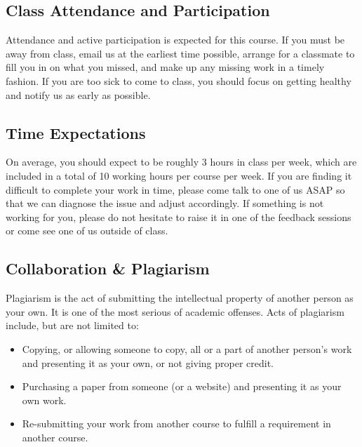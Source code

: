 \documentclass[
]{article}
\begin{document}
\hypertarget{class-attendance-and-participation}{%
\subsection*{Class Attendance and Participation}\label{class-attendance-and-participation}}

Attendance and active participation is expected for this course. If you must be away from class, email us at the earliest time possible, arrange for a classmate to fill you in on what you missed, and make up any missing work in a timely fashion. If you are too sick to come to class, you should focus on getting healthy and notify us as early as possible.

\hypertarget{time-expectations}{%
\subsection*{Time Expectations}\label{time-expectations}}

On average, you should expect to be roughly 3 hours in class per week, which are included in a total of 10 working hours per course per week. If you are finding it difficult to complete your work in time, please come talk to one of us ASAP so that we can diagnose the issue and adjust accordingly. If something is not working for you, please do not hesitate to raise it in one of the feedback sessions or come see one of us outside of class.

\hypertarget{collaboration-plagiarism}{%
\subsection*{Collaboration \& Plagiarism}\label{collaboration-plagiarism}}

Plagiarism is the act of submitting the intellectual property of another person as your own. It is one of the most serious of academic offenses. Acts of plagiarism include, but are not limited to:

\begin{itemize}
\item
  Copying, or allowing someone to copy, all or a part of another person's work and presenting it as your own, or not giving proper credit.
\item
  Purchasing a paper from someone (or a website) and presenting it as your own work.
\item
  Re-submitting your work from another course to fulfill a requirement in another course.
\end{itemize}
\end{document}
